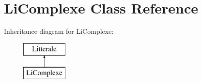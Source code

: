 \hypertarget{class_li_complexe}{}\section{Li\+Complexe Class Reference}
\label{class_li_complexe}
Inheritance diagram for Li\+Complexe\+:\begin{figure}[H]
\begin{center}
\leavevmode
\includegraphics[height=2.000000cm]{class_li_complexe}
\end{center}
\end{figure}
